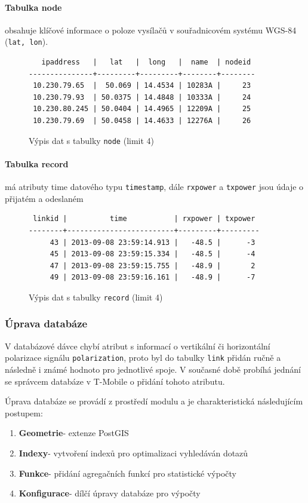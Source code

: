 \documentclass[a4paper,12pt]{report}
\begin{document}
\paragraph*{Tabulka node} obsahuje klíčové informace o poloze vysílačů v souřadnicovém systému WGS-84 (\texttt{lat, lon}).

\begin{figure}[h!]
\centering
\footnotesize
\begin{BVerbatim}
   ipaddress   |   lat   |  long   |  name  | nodeid 
---------------+---------+---------+--------+--------
 10.230.79.65  |  50.069 | 14.4534 | 10283A |     23
 10.230.79.93  | 50.0375 | 14.4848 | 10333A |     24
 10.230.80.245 | 50.0404 | 14.4965 | 12209A |     25
 10.230.79.69  | 50.0458 | 14.4633 | 12276A |     26
\end{BVerbatim}
\caption{Výpis dat s tabulky  \texttt{node} (limit 4)}
\end{figure}

\paragraph*{Tabulka record} má atributy time datového typu \texttt{timestamp}, dále \texttt{rxpower} a \texttt{txpower} jsou údaje o přijatém a odeslaném 

\begin{figure}[h!]
\centering
\footnotesize
\begin{BVerbatim}
 linkid |          time           | rxpower | txpower 
--------+-------------------------+---------+---------
     43 | 2013-09-08 23:59:14.913 |   -48.5 |      -3
     45 | 2013-09-08 23:59:15.334 |   -48.5 |      -4
     47 | 2013-09-08 23:59:15.755 |   -48.9 |       2
     49 | 2013-09-08 23:59:16.161 |   -48.9 |      -7
\end{BVerbatim}
\caption{Výpis dat s tabulky \texttt{record} (limit 4) }
\end{figure}


\subsubsection*{Úprava databáze}
\label{subsubsec:upravadatabaze}  
 V databázové dávce chybí atribut s informací o vertikální či horizontální polarizace signálu \texttt{polarization}, proto byl do tabulky \texttt{link} přidán ručně a následně i známé hodnoto pro jednotlivé spoje. V současné době probíhá jednání se správcem databáze v T-Mobile o přidání tohoto atributu.
 
Úprava databáze se provádí z prostředí modulu a je charakteristická následujícím postupem:
\begin{enumerate}
\item \textbf{Geometrie}- extenze PostGIS
\item \textbf{Indexy}- vytvoření indexů pro optimalizaci vyhledáván dotazů
\item \textbf{Funkce}- přidání agregačních funkcí pro statistické výpočty
\item \textbf{Konfigurace}- dílčí úpravy databáze pro výpočty
\end{enumerate}
\end{document}
